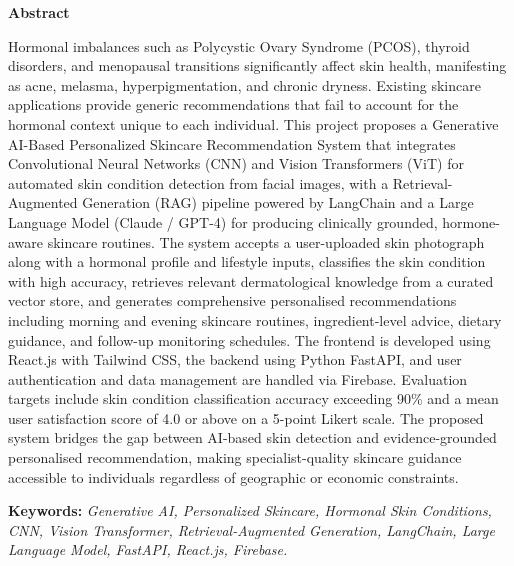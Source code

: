 \begin{center}
\bfseries \fontsize{24}{12} \selectfont Abstract
\end{center}
\vspace*{1\baselineskip}

\noindent Hormonal imbalances such as Polycystic Ovary Syndrome (PCOS), thyroid disorders, and menopausal transitions significantly affect skin health, manifesting as acne, melasma, hyperpigmentation, and chronic dryness. Existing skincare applications provide generic recommendations that fail to account for the hormonal context unique to each individual. This project proposes a Generative AI-Based Personalized Skincare Recommendation System that integrates Convolutional Neural Networks (CNN) and Vision Transformers (ViT) for automated skin condition detection from facial images, with a Retrieval-Augmented Generation (RAG) pipeline powered by LangChain and a Large Language Model (Claude / GPT-4) for producing clinically grounded, hormone-aware skincare routines. The system accepts a user-uploaded skin photograph along with a hormonal profile and lifestyle inputs, classifies the skin condition with high accuracy, retrieves relevant dermatological knowledge from a curated vector store, and generates comprehensive personalised recommendations including morning and evening skincare routines, ingredient-level advice, dietary guidance, and follow-up monitoring schedules. The frontend is developed using React.js with Tailwind CSS, the backend using Python FastAPI, and user authentication and data management are handled via Firebase. Evaluation targets include skin condition classification accuracy exceeding 90\% and a mean user satisfaction score of 4.0 or above on a 5-point Likert scale. The proposed system bridges the gap between AI-based skin detection and evidence-grounded personalised recommendation, making specialist-quality skincare guidance accessible to individuals regardless of geographic or economic constraints.

\vspace{\baselineskip}
\noindent \textbf{Keywords: } \textit{Generative AI, Personalized Skincare, Hormonal Skin Conditions, CNN, Vision Transformer, Retrieval-Augmented Generation, LangChain, Large Language Model, FastAPI, React.js, Firebase.}
